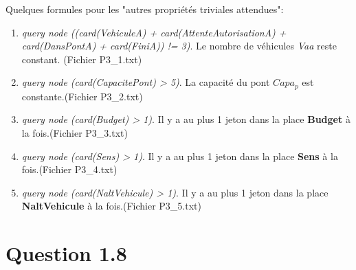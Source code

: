 \documentclass[a4paper,11pt]{report}
\begin{document}
	Quelques formules pour les "autres propriétés triviales attendues":
		\begin{enumerate}
				\item \textit{query node ((card(VehiculeA) + card(AttenteAutorisationA) + card(DansPontA) + card(FiniA)) != 3)}. Le nombre de véhicules \textit{Vaa} reste constant. (Fichier P3\_1.txt)
				\item \textit{query node (card(CapacitePont) > 5)}. La capacité du pont $Capa_p$ est constante.(Fichier P3\_2.txt)
				\item \textit{query node (card(Budget) > 1)}. Il y a au plus 1 jeton dans la place \textbf{Budget} à la fois.(Fichier P3\_3.txt)
				\item \textit{query node (card(Sens) > 1)}. Il y a au plus 1 jeton dans la place \textbf{Sens} à la fois.(Fichier P3\_4.txt)
				\item \textit{query node (card(NaltVehicule) > 1)}. Il y a au plus 1 jeton dans la place \textbf{NaltVehicule} à la fois.(Fichier P3\_5.txt)
		\end{enumerate}

\section{Question 1.8}
\end{document}
